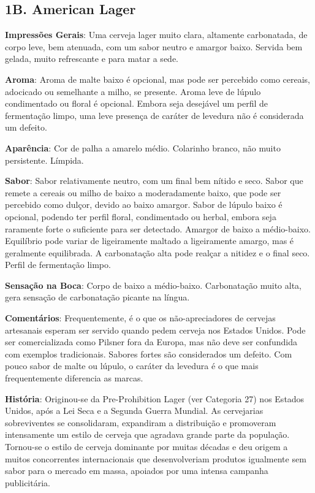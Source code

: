 \subsection*{1B. American Lager}
\textbf{Impressões Gerais}: Uma cerveja lager muito clara, altamente carbonatada, de corpo leve, bem atenuada, com um sabor neutro e amargor baixo. Servida bem gelada, muito refrescante e para matar a sede.

\textbf{Aroma}: Aroma de malte baixo é opcional, mas pode ser percebido como cereais, adocicado ou semelhante a milho, se presente. Aroma leve de lúpulo condimentado ou floral é opcional. Embora seja desejável um perfil de fermentação limpo, uma leve presença de caráter de levedura não é considerada um defeito.

\textbf{Aparência}: Cor de palha a amarelo médio. Colarinho branco, não muito persistente. Límpida.

\textbf{Sabor}: Sabor relativamente neutro, com um final bem nítido e seco. Sabor que remete a cereais ou milho de baixo a moderadamente baixo, que pode ser percebido como dulçor, devido ao baixo amargor. Sabor de lúpulo baixo é opcional, podendo ter perfil floral, condimentado ou herbal, embora seja raramente forte o suficiente para ser detectado. Amargor de baixo a médio-baixo. Equilíbrio pode variar de ligeiramente maltado a ligeiramente amargo, mas é geralmente equilibrada. A carbonatação alta pode realçar a nitidez e o final seco. Perfil de fermentação limpo.

\textbf{Sensação na Boca}: Corpo de baixo a médio-baixo. Carbonatação muito alta, gera sensação de carbonatação picante na língua.

\textbf{Comentários}: Frequentemente, é o que os não-apreciadores de cervejas artesanais esperam ser servido quando pedem cerveja nos Estados Unidos. Pode ser comercializada como Pilsner fora da Europa, mas não deve ser confundida com exemplos tradicionais. Sabores fortes são considerados um defeito. Com pouco sabor de malte ou lúpulo, o caráter da levedura é o que mais frequentemente diferencia as marcas.

\textbf{História}: Originou-se da Pre-Prohibition Lager (ver Categoria 27) nos Estados Unidos, após a Lei Seca e a Segunda Guerra Mundial. As cervejarias sobreviventes se consolidaram, expandiram a distribuição e promoveram intensamente um estilo de cerveja que agradava grande parte da população. Tornou-se o estilo de cerveja dominante por muitas décadas e deu origem a muitos concorrentes internacionais que desenvolveriam produtos igualmente sem sabor para o mercado em massa, apoiados por uma intensa campanha publicitária.

